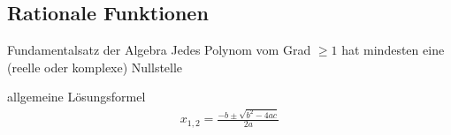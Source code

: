 \subsection{Rationale Funktionen}

\begin{karte}{Fundamentalsatz der Algebra}
	Jedes Polynom vom Grad \(\geq 1\) hat mindesten eine (reelle oder komplexe) Nullstelle
\end{karte}

\begin{karte}{allgemeine Lösungsformel}
	\begin{align}
		x_{1,2}=\frac{-b\pm\sqrt{b^2-4ac}}{2a}
	\end{align}
\end{karte}
